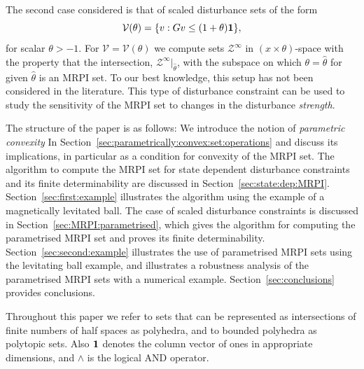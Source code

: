 \documentclass[letterpaper, 10pt, conference]{ieeeconf} %
\begin{document}
The second case considered is that of scaled disturbance sets of the form
\begin{equation}
  \mathcal V(\theta) = \{v:Gv\leq(1+\theta){\bf{1}}\},
\end{equation}
for scalar $\theta>-1$. For $\mathscr V = \mathcal V(\theta)$ we compute sets $\mathcal Z^\infty$ in 
$(x\times\theta)$-space with the property that 
the intersection, $\mathcal Z^\infty\vert_{\hat\theta}$, with the subspace on which $\theta=\hat\theta$ 
for given $\hat\theta$ is an MRPI set. To our best knowledge, this setup has not been 
considered in the literature. This type of disturbance constraint can be used to study the sensitivity of
the MRPI set to changes in the disturbance \emph{strength}.

The structure of the paper is as follows: We introduce the notion of \emph{parametric convexity} In
Section~\ref{sec:parametrically:convex:set:operations} and discuss its implications, in particular as a condition 
for convexity of the MRPI set. The algorithm to compute the MRPI set for state dependent disturbance
constraints and its finite determinability are discussed in Section~\ref{sec:state:dep:MRPI}.
Section~\ref{sec:first:example} illustrates the algorithm using the example of a magnetically 
levitated ball. The case of scaled disturbance constraints is discussed in Section~\ref{sec:MRPI:parametrised},
which gives the algorithm for computing the parametrised MRPI set and
proves its finite determinability. Section~\ref{sec:second:example} illustrates the use of
parametrised MRPI sets using the levitating ball example, and illustrates a robustness analysis of the parametrised
MRPI sets with a numerical example. Section~\ref{sec:conclusions}
provides conclusions.

Throughout this paper we refer to sets that can be represented as intersections of finite numbers of half spaces as polyhedra, and to bounded polyhedra as polytopic sets.
Also ${\bf{1}}$ denotes the column vector of ones in appropriate dimensions, and $\wedge$ is the logical AND operator. 

%
%
%
\end{document}
